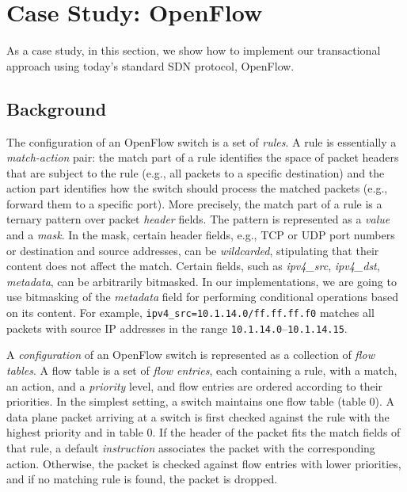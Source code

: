 \documentclass[conference]{sigcomm-alternate}
\newcommand{\liron}[1]{\textit{\textcolor{mypurple}{[liron]: #1}}} %
\newcommand{\petr}[1]{\textit{\textcolor{blue}{[petr]: #1}}} %
\begin{document}
\section{Case Study: OpenFlow}\label{sec:background}

As a case study, in this section, we show how to implement
our transactional approach using today's standard SDN protocol,
 OpenFlow. 

\subsection{Background}

The configuration of an OpenFlow switch is a set of
\emph{rules}.
A rule is essentially a \emph{match-action} pair:
the match part of a rule identifies the space of packet headers that are
subject to the rule (e.g., all packets to a specific destination) and
the action part identifies how the switch should process the matched
packets (e.g., forward them to a specific port).
More precisely, the match part of a rule is
a ternary pattern over packet \emph{header} fields.
The pattern is represented as a \emph{value} and a \emph{mask}.
In the mask, certain header fields, e.g., TCP or UDP port numbers or destination and source
addresses, can be \emph{wildcarded}, stipulating that their content does
not affect the match.
Certain fields, such as \emph{ipv4\_src}, \emph{ipv4\_dst}, \emph{metadata}, can be arbitrarily
bitmasked.
In our implementations, we are going to use bitmasking of the \emph{metadata}
field for performing conditional operations based on  its content.
For example, \texttt{ipv4\_src=10.1.14.0/ff.ff.ff.f0} matches all packets
with source IP addresses in the range \texttt{10.1.14.0}--\texttt{10.1.14.15}.

A \emph{configuration} of an OpenFlow switch is represented as a
collection of \emph{flow tables}.
A flow table is a set of \emph{flow entries}, each containing a rule,
with a match, an action, and a \emph{priority} level, and flow entries
are ordered according to their priorities.
In the simplest setting, a switch maintains one flow table (table 0).
A data plane packet arriving at a switch is first checked against
the rule with the highest priority and in table $0$.
If the header of the packet fits the match fields of that rule,
a default \emph{instruction} associates the packet with the corresponding action.
Otherwise, the packet is checked against flow  entries with lower
priorities, and if no matching rule is found, the packet is dropped.
\end{document}
